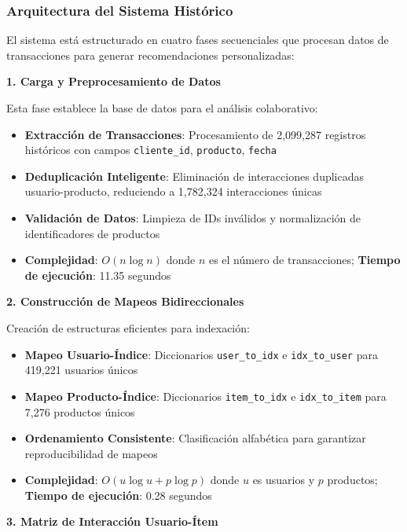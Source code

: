 \documentclass[twocolumn]{article}
\begin{document}
\subsubsection{Arquitectura del Sistema Histórico}

El sistema está estructurado en cuatro fases secuenciales que procesan datos de transacciones para generar recomendaciones personalizadas:

\textbf{1. Carga y Preprocesamiento de Datos}

Esta fase establece la base de datos para el análisis colaborativo:

\begin{itemize}
    \item \textbf{Extracción de Transacciones}: Procesamiento de 2,099,287 registros históricos con campos \texttt{cliente\_id}, \texttt{producto}, \texttt{fecha}
    \item \textbf{Deduplicación Inteligente}: Eliminación de interacciones duplicadas usuario-producto, reduciendo a 1,782,324 interacciones únicas
    \item \textbf{Validación de Datos}: Limpieza de IDs inválidos y normalización de identificadores de productos
    \item \textbf{Complejidad}: \(O(n \log n)\) donde \(n\) es el número de transacciones; \textbf{Tiempo de ejecución}: 11.35 segundos
\end{itemize}

\textbf{2. Construcción de Mapeos Bidireccionales}

Creación de estructuras eficientes para indexación:

\begin{itemize}
    \item \textbf{Mapeo Usuario-Índice}: Diccionarios \texttt{user\_to\_idx} e \texttt{idx\_to\_user} para 419,221 usuarios únicos
    \item \textbf{Mapeo Producto-Índice}: Diccionarios \texttt{item\_to\_idx} e \texttt{idx\_to\_item} para 7,276 productos únicos
    \item \textbf{Ordenamiento Consistente}: Clasificación alfabética para garantizar reproducibilidad de mapeos
    \item \textbf{Complejidad}: \(O(u \log u + p \log p)\) donde \(u\) es usuarios y \(p\) productos; \textbf{Tiempo de ejecución}: 0.28 segundos
\end{itemize}

\textbf{3. Matriz de Interacción Usuario-Ítem}
\end{document}
